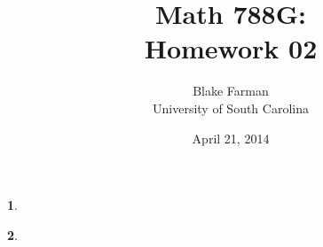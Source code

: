 \documentclass[10pt]{amsart}
\author{Blake Farman\\University of South Carolina}
\title{Math 788G:\\Homework 02}
\date{April 21, 2014}
\begin{document}
\maketitle

\providecommand{\Tr}[2]{\operatorname{Tr}_{#1}\left(#2\right)}
\providecommand{\p}{\mathfrak{p}}
\providecommand{\m}{\mathfrak{m}}
\providecommand{\Deck}[1]{\operatorname{Deck}\left(#1\right)}
\newtheorem{thm}{}
\newtheorem{lem}{Lemma}
\newtheorem{prop}{Proposition}
\theoremstyle{definition}
\newtheorem{defn}{Definition}[thm]

\newcommand{\A}{\mathbb{A}}

\begin{thm}\label{Ex1}
\end{thm}

\begin{thm}\label{Ex2}
\end{thm}
\end{document}
